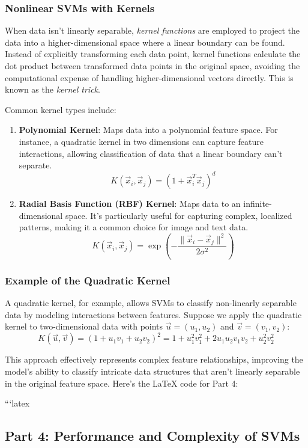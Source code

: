 \documentclass{article}
\begin{document}
\subsubsection*{Nonlinear SVMs with Kernels}
When data isn’t linearly separable, \emph{kernel functions} are employed to project the data into a higher-dimensional space where a linear boundary can be found. Instead of explicitly transforming each data point, kernel functions calculate the dot product between transformed data points in the original space, avoiding the computational expense of handling higher-dimensional vectors directly. This is known as the \emph{kernel trick}.

Common kernel types include:
\begin{enumerate}
    \item \textbf{Polynomial Kernel}: Maps data into a polynomial feature space. For instance, a quadratic kernel in two dimensions can capture feature interactions, allowing classification of data that a linear boundary can’t separate.
    \[
    K(\vec{x}_i, \vec{x}_j) = (1 + \vec{x}_i^T \vec{x}_j)^d
    \]

    \item \textbf{Radial Basis Function (RBF) Kernel}: Maps data to an infinite-dimensional space. It’s particularly useful for capturing complex, localized patterns, making it a common choice for image and text data.
    \[
    K(\vec{x}_i, \vec{x}_j) = \exp \left( -\frac{\|\vec{x}_i - \vec{x}_j\|^2}{2\sigma^2} \right)
    \]
\end{enumerate}

\subsubsection*{Example of the Quadratic Kernel}
A quadratic kernel, for example, allows SVMs to classify non-linearly separable data by modeling interactions between features. Suppose we apply the quadratic kernel to two-dimensional data with points \( \vec{u} = (u_1, u_2) \) and \( \vec{v} = (v_1, v_2) \):
\[
K(\vec{u}, \vec{v}) = (1 + u_1 v_1 + u_2 v_2)^2 = 1 + u_1^2 v_1^2 + 2 u_1 u_2 v_1 v_2 + u_2^2 v_2^2
\]

This approach effectively represents complex feature relationships, improving the model’s ability to classify intricate data structures that aren’t linearly separable in the original feature space.
Here's the LaTeX code for Part 4:

```latex
\subsection*{Part 4: Performance and Complexity of SVMs}
\end{document}
